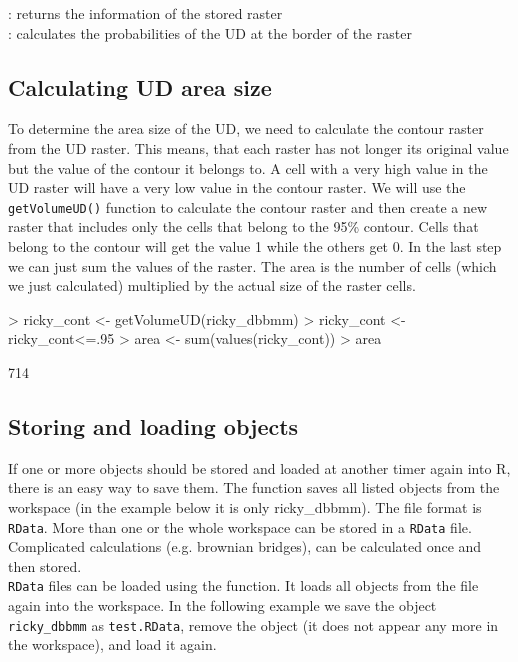 \documentclass[article,nojss]{jss}
\newcommand{\fct}[1]{{\code{#1()}}}
\begin{document}
\fct{raster}              : returns the information of the stored raster\\
\fct{outerProbability}    : calculates the probabilities of the UD at the border of the raster\\


\subsection{Calculating UD area size}
To determine the area size of the UD, we need to calculate the contour raster from the UD raster. This means, that each raster has not longer its original value but the value of the contour it belongs to. A cell with a very high value in the UD raster will have a very low value in the contour raster. We will use the \texttt{getVolumeUD()} function to calculate the contour raster and then create a new raster that includes only the cells that belong to the 95\% contour. Cells that belong to the contour will get the value 1 while the others get 0. In the last step we can just sum the values of the raster. The area is the number of cells (which we just calculated) multiplied by the actual size of the raster cells. 

\begin{Schunk}
\begin{Sinput}
> ricky_cont <- getVolumeUD(ricky_dbbmm)
> ricky_cont <- ricky_cont<=.95
> area <- sum(values(ricky_cont))
> area
\end{Sinput}
\begin{Soutput}
[1] 714
\end{Soutput}
\end{Schunk}

\subsection{Storing and loading objects}
If one or more objects should be stored and loaded at another timer again into R, there is an easy way to save them. The \fct{save} function saves all listed objects from the workspace (in the example below it is only ricky\_dbbmm). The file format is \texttt{RData}. More than one or the whole workspace can be stored in a \texttt{RData} file. Complicated calculations (e.g. brownian bridges), can be calculated once and then stored. \\
\texttt{RData} files can be loaded using the \fct{load} function. It loads all objects from the file again into the workspace. In the following example we save the object \texttt{ricky\_dbbmm} as \texttt{test.RData}, remove the object (it does not appear any more in the workspace), and load it again.
\end{document}
